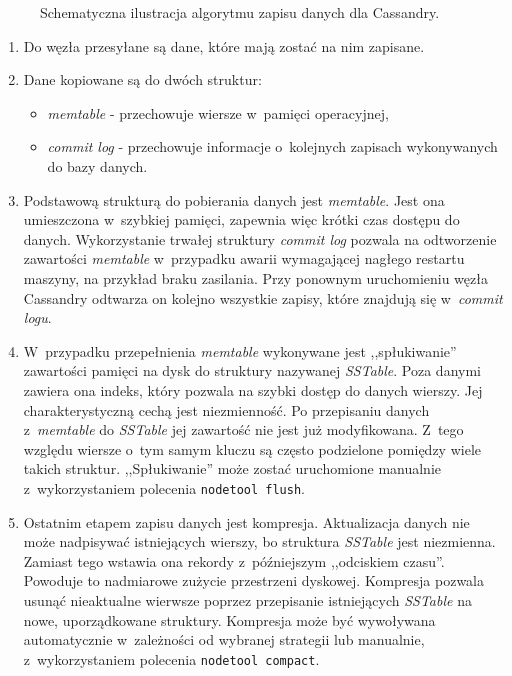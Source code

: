 \begin{figure}[ht!]
	\caption{Schematyczna ilustracja algorytmu zapisu danych dla Cassandry.}
	\label{fig:cassandra_data_store_diagram}
\end{figure}

\begin{enumerate}
	\item Do węzła przesyłane są dane, które mają zostać na nim zapisane. 
	\item Dane kopiowane są do dwóch struktur:
		\begin{itemize}
			\item \emph{memtable} - przechowuje wiersze w~pamięci operacyjnej,
			\item \emph{commit log} - przechowuje informacje o~kolejnych zapisach wykonywanych do bazy danych.
		\end{itemize}
	\item Podstawową strukturą do pobierania danych jest \emph{memtable}. Jest ona umieszczona w~szybkiej pamięci, zapewnia więc krótki czas dostępu do danych. Wykorzystanie trwałej struktury \emph{commit log} pozwala na odtworzenie zawartości \emph{memtable} w~przypadku awarii wymagającej nagłego restartu maszyny, na przykład braku zasilania. Przy ponownym uruchomieniu węzła Cassandry odtwarza on kolejno wszystkie zapisy, które znajdują się w~\emph{commit logu}.
	\item W~przypadku przepełnienia \emph{memtable} wykonywane jest ,,spłukiwanie'' zawartości pamięci na dysk do struktury nazywanej \emph{SSTable}. Poza danymi zawiera ona indeks, który pozwala na szybki dostęp do danych wierszy. Jej charakterystyczną cechą jest niezmienność. Po przepisaniu danych z~\emph{memtable} do \emph{SSTable} jej zawartość nie jest już modyfikowana. Z~tego względu wiersze o~tym samym kluczu są często podzielone pomiędzy wiele takich struktur. ,,Spłukiwanie'' może zostać uruchomione manualnie z~wykorzystaniem polecenia \verb+nodetool flush+.
	\item Ostatnim etapem zapisu danych jest kompresja. Aktualizacja danych nie może nadpisywać istniejących wierszy, bo struktura \emph{SSTable} jest niezmienna. Zamiast tego wstawia ona rekordy z~późniejszym ,,odciskiem czasu''. Powoduje to nadmiarowe zużycie przestrzeni dyskowej. Kompresja pozwala usunąć nieaktualne wierwsze poprzez przepisanie istniejących \emph{SSTable} na nowe, uporządkowane struktury. Kompresja może być wywoływana automatycznie w~zależności od wybranej strategii lub manualnie, z~wykorzystaniem polecenia \verb+nodetool compact+.
\end{enumerate}

